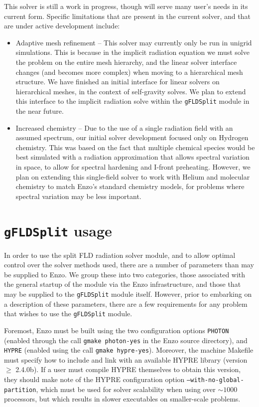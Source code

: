 \documentclass[letterpaper,10pt]{article}
\renewcommand{\(}{\left(}
\renewcommand{\)}{\right)}
\begin{document}
This solver is still a work in progress, though will serve many user's
needs in its current form.  Specific limitations that are present in
the current solver, and that are under active development include:
\begin{itemize}
\item Adaptive mesh refinement -- This solver may currently only be
  run in unigrid simulations.  This is because in the implicit
  radiation equation we must solve the problem on the entire mesh
  hierarchy, and the linear solver interface changes (and becomes more
  complex) when moving to a hierarchical mesh structure.  We have
  finished an initial interface for linear solvers on hierarchical
  meshes, in the context of self-gravity solves.  We plan to extend
  this interface to the implicit radiation solve within the 
  {\tt gFLDSplit} module in the near future. 
\item Increased chemistry -- Due to the use of a single radiation
  field with an assumed spectrum, our initial solver development
  focused only on Hydrogen chemistry.  This was based on the fact that
  multiple chemical species would be best simulated with a radiation
  approximation that allows spectral variation in space, to allow for
  spectral hardening and I-front preheating.  However, we plan on
  extending this single-field solver to work with Helium and molecular
  chemistry to match Enzo's standard chemistry models, for problems
  where spectral variation may be less important.
\end{itemize}




\section{{\tt gFLDSplit} usage}
\label{sec:module_usage}

In order to use the split FLD radiation solver module, and to
allow optimal control over the solver methods used, there are a number
of parameters than may be supplied to Enzo.  We group these into two
categories, those associated with the general startup of the module
via the Enzo infrastructure, and those that may be supplied to the
{\tt gFLDSplit} module itself.  However, prior to embarking on a
description of these parameters, there are a few requirements for any
problem that wishes to use the {\tt gFLDSplit} module. 

Foremost, Enzo must be built using the two configuration options
{\tt PHOTON} (enabled through the call {\tt gmake photon-yes} in the
Enzo source directory), and {\tt HYPRE} (enabled using the call 
{\tt gmake hypre-yes}).  Moreover, the machine Makefile must specify
how to include and link with an available HYPRE library (version $\ge$
2.4.0b).  If a user must compile HYPRE themselves to obtain this
version, they should make note of the HYPRE configuration option
{\tt --with-no-global-partition}, which must be used for solver
scalability when using over $\sim\!1000$ processors, but which results
in slower executables on smaller-scale problems.
\end{document}
